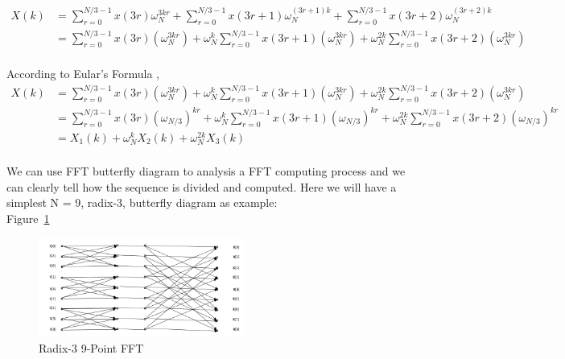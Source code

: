 \documentclass[12pt]{article}
\begin{document}
\begin{align*} X(k) &= \sum\limits_{r=0}^{N/3 -1}x(3r)\omega_{N}^{3kr} +
\sum\limits_{r=0}^{N/3 -1}x(3r+1)\omega_{N}^{(3r+ 1)k} + \sum\limits_{r=0}^{N/3
-1}x(3r+2)\omega_{N}^{(3r+ 2)k}\\ & = \sum\limits_{r=0}^{N/3 -1}x(3r)(\omega_{N}^{3kr})
+ \omega_{N}^{k}\sum\limits_{r=0}^{N/3 -1}x(3r+1)(\omega_{N}^{3kr})+
\omega_{N}^{2k}\sum\limits_{r=0}^{N/3 -1}x(3r+2)(\omega_{N}^{3kr})\\ \end{align*}

According to Eular's Formula ,\\

\begin{align*} X(k) & = \sum\limits_{r=0}^{N/3 -1}x(3r)(\omega_{N}^{3kr})
+ \omega_{N}^{k}\sum\limits_{r=0}^{N/3 -1}x(3r+1)(\omega_{N}^{3kr})+
\omega_{N}^{2k}\sum\limits_{r=0}^{N/3 -1}x(3r+2)(\omega_{N}^{3kr})\\ & =
\sum\limits_{r=0}^{N/3 -1}x(3r)(\omega_{N/3})^{kr} + \omega_{N}^{k}\sum\limits_{r=0}^{N/3
-1}x(3r+1)(\omega_{N/3})^{kr} + \omega_{N}^{2k}\sum\limits_{r=0}^{N/3
-1}x(3r+2)(\omega_{N/3})^{kr}\\ & = X_1(k) + \omega_N^kX_2(k) + \omega_N^{2k}X_3(k)\\
\end{align*}

We can use FFT butterfly diagram to analysis a FFT computing process and we can
clearly tell how the sequence is divided and computed. Here we will have a
simplest N = 9, radix-3, butterfly diagram as example:\\

Figure~\ref{Fig_Radix-3FFT}

\begin{figure}[h!] \begin{center}
\includegraphics[width=0.6\textwidth]{butterflyRedix3} \caption{Radix-3 9-Point
FFT} \label{Fig_Radix-3FFT} \end{center} \end{figure}
\end{document}
